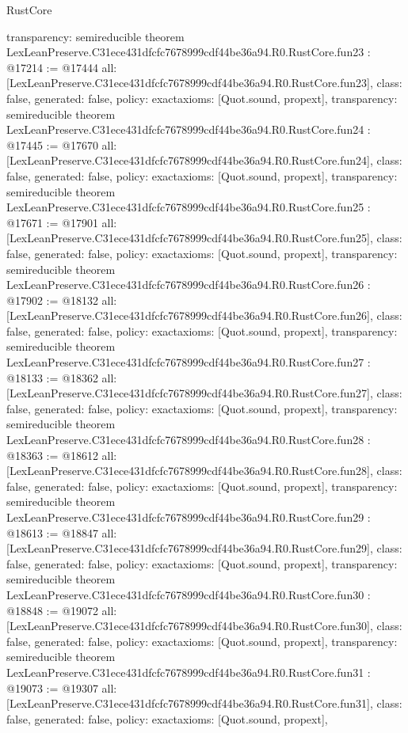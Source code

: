 \begin{lexlean}{RustCore}
\begin{coremodule}
{  transparency: semireducible
}
theorem LexLeanPreserve.C31ece431dfcfc7678999cdf44be36a94.R0.RustCore.fun23 : @17214 := @17444 {
  all: [LexLeanPreserve.C31ece431dfcfc7678999cdf44be36a94.R0.RustCore.fun23],
  class: false,
  generated: false,
  policy: exact{axioms: [Quot.sound, propext]},
  transparency: semireducible
}
theorem LexLeanPreserve.C31ece431dfcfc7678999cdf44be36a94.R0.RustCore.fun24 : @17445 := @17670 {
  all: [LexLeanPreserve.C31ece431dfcfc7678999cdf44be36a94.R0.RustCore.fun24],
  class: false,
  generated: false,
  policy: exact{axioms: [Quot.sound, propext]},
  transparency: semireducible
}
theorem LexLeanPreserve.C31ece431dfcfc7678999cdf44be36a94.R0.RustCore.fun25 : @17671 := @17901 {
  all: [LexLeanPreserve.C31ece431dfcfc7678999cdf44be36a94.R0.RustCore.fun25],
  class: false,
  generated: false,
  policy: exact{axioms: [Quot.sound, propext]},
  transparency: semireducible
}
theorem LexLeanPreserve.C31ece431dfcfc7678999cdf44be36a94.R0.RustCore.fun26 : @17902 := @18132 {
  all: [LexLeanPreserve.C31ece431dfcfc7678999cdf44be36a94.R0.RustCore.fun26],
  class: false,
  generated: false,
  policy: exact{axioms: [Quot.sound, propext]},
  transparency: semireducible
}
theorem LexLeanPreserve.C31ece431dfcfc7678999cdf44be36a94.R0.RustCore.fun27 : @18133 := @18362 {
  all: [LexLeanPreserve.C31ece431dfcfc7678999cdf44be36a94.R0.RustCore.fun27],
  class: false,
  generated: false,
  policy: exact{axioms: [Quot.sound, propext]},
  transparency: semireducible
}
theorem LexLeanPreserve.C31ece431dfcfc7678999cdf44be36a94.R0.RustCore.fun28 : @18363 := @18612 {
  all: [LexLeanPreserve.C31ece431dfcfc7678999cdf44be36a94.R0.RustCore.fun28],
  class: false,
  generated: false,
  policy: exact{axioms: [Quot.sound, propext]},
  transparency: semireducible
}
theorem LexLeanPreserve.C31ece431dfcfc7678999cdf44be36a94.R0.RustCore.fun29 : @18613 := @18847 {
  all: [LexLeanPreserve.C31ece431dfcfc7678999cdf44be36a94.R0.RustCore.fun29],
  class: false,
  generated: false,
  policy: exact{axioms: [Quot.sound, propext]},
  transparency: semireducible
}
theorem LexLeanPreserve.C31ece431dfcfc7678999cdf44be36a94.R0.RustCore.fun30 : @18848 := @19072 {
  all: [LexLeanPreserve.C31ece431dfcfc7678999cdf44be36a94.R0.RustCore.fun30],
  class: false,
  generated: false,
  policy: exact{axioms: [Quot.sound, propext]},
  transparency: semireducible
}
theorem LexLeanPreserve.C31ece431dfcfc7678999cdf44be36a94.R0.RustCore.fun31 : @19073 := @19307 {
  all: [LexLeanPreserve.C31ece431dfcfc7678999cdf44be36a94.R0.RustCore.fun31],
  class: false,
  generated: false,
  policy: exact{axioms: [Quot.sound, propext]},
}
\end{coremodule}
\end{lexlean}
